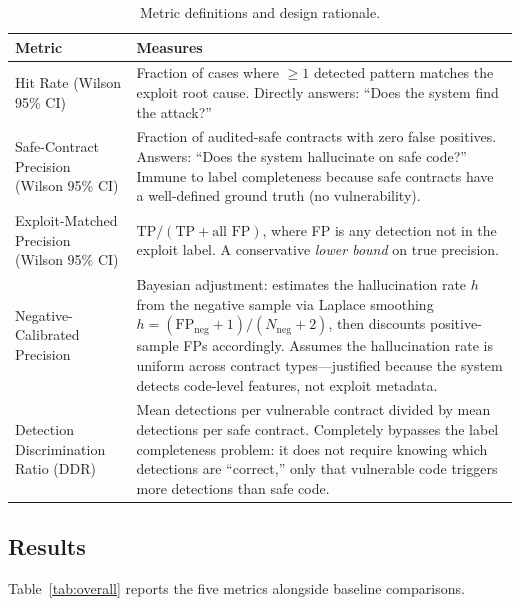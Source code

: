 \documentclass[10pt]{article}
\begin{document}
\begin{table}[H]
\centering
\caption{Metric definitions and design rationale.}
\label{tab:metrics}
\small
\begin{tabular}{p{2.8cm}p{12cm}}
\toprule
Metric & Measures \\
\midrule
Hit Rate (Wilson 95\% CI) & Fraction of cases where $\geq 1$ detected pattern matches the exploit root cause. Directly answers: ``Does the system find the attack?'' \\
Safe-Contract Precision (Wilson 95\% CI) & Fraction of audited-safe contracts with zero false positives. Answers: ``Does the system hallucinate on safe code?'' Immune to label completeness because safe contracts have a well-defined ground truth (no vulnerability). \\
Exploit-Matched Precision (Wilson 95\% CI) & $\text{TP} / (\text{TP} + \text{all FP})$, where FP is any detection not in the exploit label. A conservative \emph{lower bound} on true precision. \\
Negative-Calibrated Precision & Bayesian adjustment: estimates the hallucination rate $h$ from the negative sample via Laplace smoothing $h = (\text{FP}_{\text{neg}} + 1) / (N_{\text{neg}} + 2)$, then discounts positive-sample FPs accordingly. Assumes the hallucination rate is uniform across contract types---justified because the system detects code-level features, not exploit metadata. \\
Detection Discrimination Ratio (DDR) & Mean detections per vulnerable contract divided by mean detections per safe contract. Completely bypasses the label completeness problem: it does not require knowing which detections are ``correct,'' only that vulnerable code triggers more detections than safe code. \\
\bottomrule
\end{tabular}
\end{table}

\subsection{Results}

Table~\ref{tab:overall} reports the five metrics alongside baseline comparisons.
\end{document}
